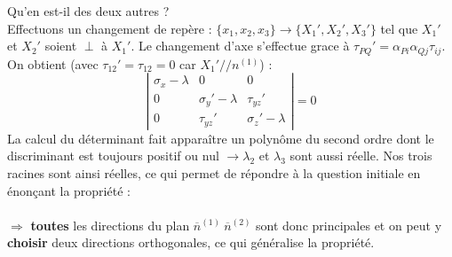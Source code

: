     Qu'en est-il des deux autres ?\\
    Effectuons un changement de repère : $\{x_1,x_2,x_3\}\rightarrow \{X_1',X_2',X_3'\}$ tel que 
    $X_1'$ et $X_2'$ soient $\perp$ à $X_1'$. Le changement d'axe s'effectue grace à $\tau_{PQ}' = \alpha_{Pi}
    \alpha_{Qj}\tau_{ij}$. On obtient (avec $\tau_{12}' = \tau_{12} = 0$ car $X_1' // n^{(1)}$) :
    \begin{equation}
    \left|\begin{array}{ccc}
    \sigma_x - \lambda      &0                      &0 \\
    0                       &\sigma_y'-\lambda       &\tau_{yz}'\\
    0                       &\tau_{yz}'              &\sigma_z' - \lambda
    \end{array}\right| = 0
    \end{equation}
    La calcul du déterminant fait apparaître un polynôme du second ordre dont le discriminant est toujours
    positif ou nul $\rightarrow \lambda_2$ et $\lambda_3$ sont aussi réelle. Nos trois racines sont ainsi
    réelles, ce qui permet de répondre à la question initiale en énonçant la propriété :\\
    
    \ \\
    $\Rightarrow$ \textbf{toutes} les directions du plan $\overline{n}^{(1)}\ \overline{n}^{(2)}$ sont donc
    principales et on peut y \textbf{choisir} deux directions orthogonales, ce qui généralise la propriété.
    
    
